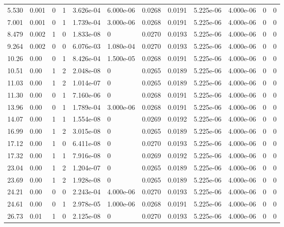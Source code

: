 \documentclass[preview]{standalone}
\begin{document}
{{\begin{tabular}{L{1.2cm}C{1.2cm} C{0.3cm}C{0.5cm} C{1.4cm}C{1.4cm} C{1.4cm}C{1.4cm} C{1.6cm}C{1.6cm} C{1.6cm}C{1.6cm}}
  5.530  &  0.001  & 0     &  1 &  3.626e-04  & 6.000e-06  &  0.0268&   0.0191& 5.225e-06 & 4.000e-06   &  0 & 0  \\ 
  7.001  &  0.001  & 0     &  1 &  1.739e-04  & 3.000e-06  &  0.0268&   0.0191& 5.225e-06 & 4.000e-06   &  0 & 0  \\ 
  8.479  &  0.002  & 1     &  0 &  1.833e-08  & 0  &  0.0270&   0.0193& 5.225e-06 & 4.000e-06   &  0 & 0  \\ 
  9.264  &  0.002  & 0     &  0 &  6.076e-03  & 1.080e-04  &  0.0270&   0.0193& 5.225e-06 & 4.000e-06   &  0 & 0  \\ 
  10.26  &  0.00  & 0     &  1 &  8.426e-04  & 1.500e-05  &  0.0268&   0.0191& 5.225e-06 & 4.000e-06   &  0 & 0  \\ 
  10.51  &  0.00  & 1     &  2 &  2.048e-08  & 0  &  0.0265&   0.0189& 5.225e-06 & 4.000e-06   &  0 & 0  \\ 
  11.03  &  0.00  & 1     &  2 &  1.014e-07  & 0  &  0.0265&   0.0189& 5.225e-06 & 4.000e-06   &  0 & 0  \\ 
  11.30  &  0.00  & 0     &  1 &  7.160e-06  & 0  &  0.0268&   0.0191& 5.225e-06 & 4.000e-06   &  0 & 0  \\ 
  13.96  &  0.00  & 0     &  1 &  1.789e-04  & 3.000e-06  &  0.0268&   0.0191& 5.225e-06 & 4.000e-06   &  0 & 0  \\ 
  14.07  &  0.00  & 1     &  1 &  1.554e-08  & 0  &  0.0269&   0.0192& 5.225e-06 & 4.000e-06   &  0 & 0  \\ 
  16.99  &  0.00  & 1     &  2 &  3.015e-08  & 0  &  0.0265&   0.0189& 5.225e-06 & 4.000e-06   &  0 & 0  \\ 
  17.12  &  0.00  & 1     &  0 &  6.411e-08  & 0  &  0.0270&   0.0193& 5.225e-06 & 4.000e-06   &  0 & 0  \\ 
  17.32  &  0.00  & 1     &  1 &  7.916e-08  & 0  &  0.0269&   0.0192& 5.225e-06 & 4.000e-06   &  0 & 0  \\ 
  23.04  &  0.00  & 1     &  2 &  1.204e-07  & 0  &  0.0265&   0.0189& 5.225e-06 & 4.000e-06   &  0 & 0  \\ 
  23.69  &  0.00  & 1     &  2 &  1.928e-08  & 0  &  0.0265&   0.0189& 5.225e-06 & 4.000e-06   &  0 & 0  \\ 
  24.21  &  0.00  & 0     &  0 &  2.243e-04  & 4.000e-06  &  0.0270&   0.0193& 5.225e-06 & 4.000e-06   &  0 & 0  \\ 
  24.61  &  0.00  & 0     &  1 &  2.978e-05  & 1.000e-06  &  0.0268&   0.0191& 5.225e-06 & 4.000e-06   &  0 & 0  \\ 
  26.73  &  0.01  & 1     &  0 &  2.125e-08  & 0  &  0.0270&   0.0193& 5.225e-06 & 4.000e-06   &  0 & 0  \\ 

\end{tabular}}}
\end{document}
